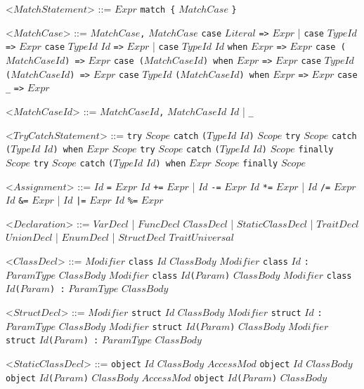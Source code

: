 \documentclass{article}
\newcommand{\gtext}[1]{<$#1$>}
\newcommand{\glit}[1]{\texttt{#1}}
\begin{document}
\begin{grammar}
	\gtext{MatchStatement} ::= $Expr$ \glit{match \{} $MatchCase$ \glit{\}} 
	
	\gtext{MatchCase} ::= $MatchCase$\glit{,} $MatchCase$
	\alt \glit{case} $Literal$ \glit{=>} $Expr$ | \glit{case} $TypeId$ \glit{=>} $Expr$ 
	\alt \glit{case} $TypeId$ $Id$ \glit{=>} $Expr$ | \glit{case} $TypeId$ $Id$ \glit{when} $Expr$ \glit{=>} $Expr$ 
	\alt \glit{case (}$MatchCaseId$\glit{) =>} $Expr$
	\alt \glit{case (}$MatchCaseId$\glit{) when} $Expr$ \glit{=>} $Expr$ 
	\alt \glit{case} $TypeId$ \glit{(}$MatchCaseId$\glit{) =>} $Expr$
	\alt \glit{case} $TypeId$ \glit{(}$MatchCaseId$\glit{) when} $Expr$ \glit{=>} $Expr$ 
	\alt \glit{case} \glit{_} \glit{=>} $Expr$
	
	\gtext{MatchCaseId} ::= $MatchCaseId$\glit{,} $MatchCaseId$
	\alt $Id$ | \glit{_}

	\gtext{TryCatchStatement} ::= \glit{try} $Scope$ \glit{catch} \glit{(}$TypeId$ $Id$\glit{)} $Scope$
	\alt \glit{try} $Scope$ \glit{catch} \glit{(}$TypeId$ $Id$\glit{) when} $Expr$ $Scope$  
	\alt \glit{try} $Scope$ \glit{catch} \glit{(}$TypeId$ $Id$\glit{)} $Scope$ \glit{finally} $Scope$
	\alt \glit{try} $Scope$ \glit{catch} \glit{(}$TypeId$ $Id$\glit{) when} $Expr$ $Scope$ \glit{finally} $Scope$

	\gtext{Assignment} ::= $Id$ \glit{=} $Expr$
	\alt $Id$ \glit{+=} $Expr$ | $Id$ \glit{-=} $Expr$
	\alt $Id$ \glit{*=} $Expr$ | $Id$ \glit{/=} $Expr$
	\alt $Id$ \glit{\&=} $Expr$ | $Id$ \glit{|=} $Expr$
	\alt $Id$ \glit{\%=} $Expr$
	
	\newpage	
	
	\gtext{Declaration} ::=  $VarDecl$ | $FuncDecl$ %
	\alt $ClassDecl$ | $StaticClassDecl$ |  $TraitDecl$ %
	\alt $UnionDecl$ | $EnumDecl$ | $StructDecl$ %
	\alt $TraitUniversal$ %
	
	\gtext{ClassDecl} ::= $Modifier$ \glit{class} $Id$ $ClassBody$
	\alt $Modifier$ \glit{class} $Id$ \glit{:} $ParamType$ $ClassBody$
	\alt $Modifier$ \glit{class} $Id$\glit{(}$Param$\glit{)} $ClassBody$
	\alt $Modifier$ \glit{class} $Id$\glit{(}$Param$\glit{) :} $ParamType$ $ClassBody$
	
	\gtext{StructDecl} ::= $Modifier$ \glit{struct} $Id$ $ClassBody$
	\alt $Modifier$ \glit{struct} $Id$ \glit{:} $ParamType$ $ClassBody$
	\alt $Modifier$ \glit{struct} $Id$\glit{(}$Param$\glit{)} $ClassBody$
	\alt $Modifier$ \glit{struct} $Id$\glit{(}$Param$\glit{) :} $ParamType$ $ClassBody$
	
	\gtext{StaticClassDecl} ::= \glit{object} $Id$ $ClassBody$
	\alt $AccessMod$ \glit{object} $Id$ $ClassBody$
	\alt \glit{object} $Id$\glit{(}$Param$\glit{)} $ClassBody$
	\alt $AccessMod$ \glit{object} $Id$\glit{(}$Param$\glit{)} $ClassBody$
	

\end{grammar}
\end{document}
